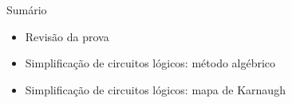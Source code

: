 
\begin{frame}{Sumário}
    \begin{itemize}
        \item Revisão da prova
        \item Simplificação de circuitos lógicos: método algébrico
        \item Simplificação de circuitos lógicos: mapa de Karnaugh
    \end{itemize}
\end{frame}